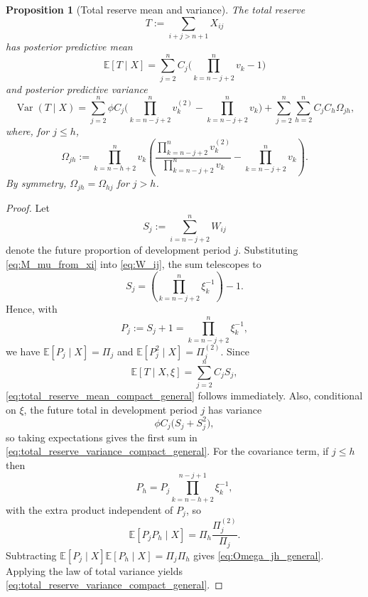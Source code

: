 \documentclass[11pt]{article}
\newtheorem{proposition}[theorem]{Proposition}
\newcommand{\E}{\mathbb{E}}
\newcommand{\Var}{\operatorname{Var}}
\newcommand{\1}{\mathbf{1}}
\begin{document}
\begin{proposition}[Total reserve mean and variance]\label{prop:total_reserve_variance_general_compact}
The total reserve
\begin{equation}
T:=\sum_{i+j>n+1} X_{ij}
\end{equation}
has posterior predictive mean
\begin{equation}
\E[T\mid X]=\sum_{j=2}^{n} C_j\bigl(\prod_{k=n-j+2}^{n} v_k-1\bigr)
\label{eq:total_reserve_mean_compact_general}
\end{equation}
and posterior predictive variance
\begin{equation}
\Var(T\mid X)
=
\sum_{j=2}^{n}\phi C_j\bigl(\prod_{k=n-j+2}^{n} v_k^{(2)}-\prod_{k=n-j+2}^{n} v_k\bigr)
+
\sum_{j=2}^{n}\sum_{h=2}^{n} C_jC_h\Omega_{jh},
\label{eq:total_reserve_variance_compact_general}
\end{equation}
where, for $j\le h$,
\begin{equation}
\Omega_{jh}
:=
\prod_{k=n-h+2}^{n} v_k\left(\frac{\prod_{k=n-j+2}^{n} v_k^{(2)}}{\prod_{k=n-j+2}^{n} v_k}-\prod_{k=n-j+2}^{n} v_k\right).
\label{eq:Omega_jh_general}
\end{equation}
By symmetry, $\Omega_{jh}=\Omega_{hj}$ for $j>h$.
\end{proposition}

\begin{proof}
Let
\begin{equation}
S_j:=\sum_{i=n-j+2}^{n} W_{ij}
\end{equation}
denote the future proportion of development period $j$. Substituting \eqref{eq:M_mu_from_xi} into \eqref{eq:W_ij}, the sum telescopes to
\begin{equation}
S_j=\left(\prod_{k=n-j+2}^{n}\xi_k^{-1}\right)-1.
\label{eq:Sj_telescoped_general}
\end{equation}
Hence, with
\begin{equation}
P_j:=S_j+1=\prod_{k=n-j+2}^{n}\xi_k^{-1},
\end{equation}
we have $\E[P_j\mid X]=\Pi_j$ and $\E[P_j^2\mid X]=\Pi_j^{(2)}$. Since
\begin{equation}
\E[T\mid X,\xi]=\sum_{j=2}^{n} C_j S_j,
\end{equation}
\eqref{eq:total_reserve_mean_compact_general} follows immediately. Also, conditional on $\xi$, the future total in development period $j$ has variance
\begin{equation}
\phi C_j\bigl(S_j+S_j^2\bigr),
\end{equation}
so taking expectations gives the first sum in \eqref{eq:total_reserve_variance_compact_general}. For the covariance term, if $j\le h$ then
\begin{equation}
P_h=P_j\prod_{k=n-h+2}^{n-j+1}\xi_k^{-1},
\end{equation}
with the extra product independent of $P_j$, so
\begin{equation}
\E[P_jP_h\mid X]=\Pi_h\frac{\Pi_j^{(2)}}{\Pi_j}.
\end{equation}
Subtracting $\E[P_j\mid X]\E[P_h\mid X]=\Pi_j\Pi_h$ gives \eqref{eq:Omega_jh_general}. Applying the law of total variance yields \eqref{eq:total_reserve_variance_compact_general}.
\end{proof}
\end{document}
